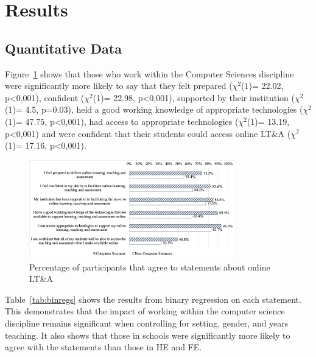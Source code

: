 \documentclass[sigconf]{acmart}
\begin{document}
\section{Results}\label{results}

\subsection{Quantitative Data}\label{quantdata}

Figure~\ref{fig:partagree} shows that those who work within the
Computer Sciences discipline were significantly more likely to say
that they felt prepared ($\chi^2$(1)= 22.02, p<0,001), confident
($\chi^2$(1)= 22.98, p<0,001), supported by their institution
($\chi^2$(1)= 4.5, p=0.03), held a good working knowledge of
appropriate technologies ($\chi^2$(1)= 47.75, p<0,001), had access to
appropriate technologies ($\chi^2$(1)= 13.19, p<0,001) and were
confident that their students could access online LT\&A ($\chi^2$(1)=
17.16, p<0,001).

\begin{figure}
\includegraphics[width=0.8\textwidth]{images/particagree.png}
\caption{Percentage of participants that agree to statements about
  online LT\&A}
\label{fig:partagree}
\end{figure}

Table~\ref{tab:binregs} shows the results from binary regression on each
statement. This demonstrates that the impact of working within the
computer science discipline remains significant when controlling for
setting, gender, and years teaching. It also shows that those in
schools were significantly more likely to agree with the statements
than those in HE and FE.
\end{document}
